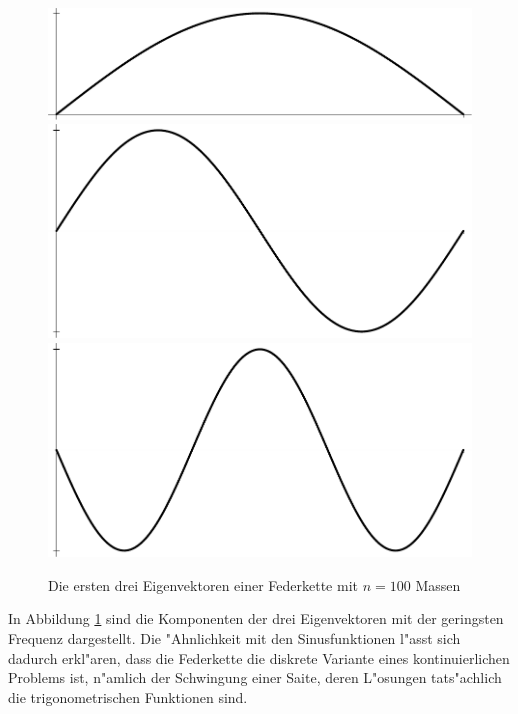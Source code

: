 \begin{figure}
\begin{center}
\includegraphics[width=\hsize]{images/e-12}\\
\includegraphics[width=\hsize]{images/e-13}\\
\includegraphics[width=\hsize]{images/e-14}
\end{center}
\caption{Die ersten drei Eigenvektoren einer Federkette mit $n=100$
Massen\label{eigenvektoren-n100}}
\end{figure}
In Abbildung \ref{eigenvektoren-n100} sind die Komponenten der drei
Eigenvektoren mit der geringsten Frequenz dargestellt.
Die "Ahnlichkeit mit den Sinusfunktionen l"asst sich dadurch erkl"aren,
dass die Federkette die diskrete Variante eines kontinuierlichen
Problems ist, n"amlich der Schwingung einer Saite, deren L"osungen
tats"achlich die trigonometrischen Funktionen sind.

